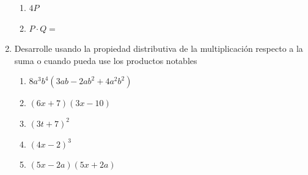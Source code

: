 \documentclass[letterpaper,fleqn]{article}
\begin{document}
\begin{enumerate}
\begin{enumerate}
 \item $4P$
 \item $P\cdot Q=$
\end{enumerate}
\item Desarrolle usando la propiedad distributiva de la multiplicación respecto a la suma o cuando pueda use los productos notables
\begin{enumerate}
 \item $8a^{3}b^{4}(3ab-2ab^{2}+4a^{2}b^{2})$
 \item $(6x+7)(3x-10)$
 \item $(3t+7)^{2}$
 \item $(4x-2)^{3}$
 \item $(5x-2a)(5x+2a)$
\end{enumerate}
 \end{enumerate}
\end{document}

